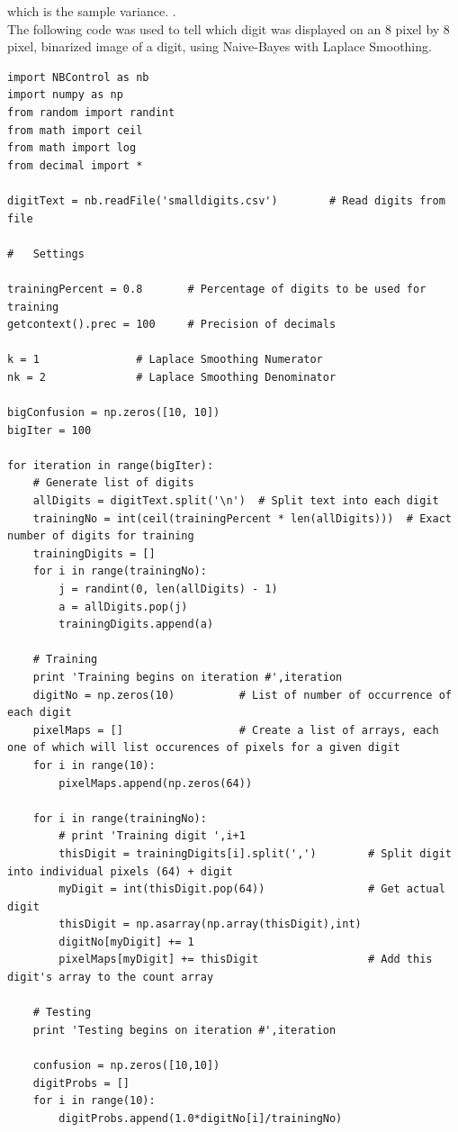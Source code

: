 \documentclass[10pt]{article}
\begin{document}
which is the sample variance.
.\\
The following code was used to tell which digit was displayed on an 8 pixel by 8 pixel, binarized image of a digit, using Naive-Bayes with Laplace Smoothing.
\begin{lstlisting}
import NBControl as nb
import numpy as np
from random import randint
from math import ceil
from math import log
from decimal import *

digitText = nb.readFile('smalldigits.csv')        # Read digits from file

#   Settings

trainingPercent = 0.8       # Percentage of digits to be used for training
getcontext().prec = 100     # Precision of decimals

k = 1               # Laplace Smoothing Numerator
nk = 2              # Laplace Smoothing Denominator

bigConfusion = np.zeros([10, 10])
bigIter = 100

for iteration in range(bigIter):
    # Generate list of digits
    allDigits = digitText.split('\n')  # Split text into each digit
    trainingNo = int(ceil(trainingPercent * len(allDigits)))  # Exact number of digits for training
    trainingDigits = []
    for i in range(trainingNo):
        j = randint(0, len(allDigits) - 1)
        a = allDigits.pop(j)
        trainingDigits.append(a)

    # Training
    print 'Training begins on iteration #',iteration
    digitNo = np.zeros(10)          # List of number of occurrence of each digit
    pixelMaps = []                  # Create a list of arrays, each one of which will list occurences of pixels for a given digit
    for i in range(10):
        pixelMaps.append(np.zeros(64))

    for i in range(trainingNo):
        # print 'Training digit ',i+1
        thisDigit = trainingDigits[i].split(',')        # Split digit into individual pixels (64) + digit
        myDigit = int(thisDigit.pop(64))                # Get actual digit
        thisDigit = np.asarray(np.array(thisDigit),int)
        digitNo[myDigit] += 1
        pixelMaps[myDigit] += thisDigit                 # Add this digit's array to the count array

    # Testing
    print 'Testing begins on iteration #',iteration

    confusion = np.zeros([10,10])
    digitProbs = []
    for i in range(10):
        digitProbs.append(1.0*digitNo[i]/trainingNo)


\end{lstlisting}
\end{document}
